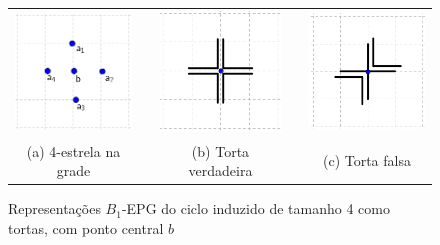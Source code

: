 \begin{figure}[htb]
  \centering
  \begin{tabular}{c c c c c }
    \includegraphics[width=3.5cm]{./img/disposicaoTortaGrid.png}    
    & &\includegraphics[width=3.5cm]{./img/truePieGrid.png} 
    & &
 \includegraphics[width=3.5cm]{./img/falsePieGrid.png} \\%
    {\footnotesize (a) 4-estrela na grade}  & &  {\footnotesize (b) Torta verdadeira} & & {\footnotesize (c) Torta falsa} %
  \end{tabular}
  \caption{Representações $B_{1}$-EPG do ciclo induzido de tamanho  4 como tortas, com ponto central $b$}\label{fig:piesInGrid2}
\end{figure} 